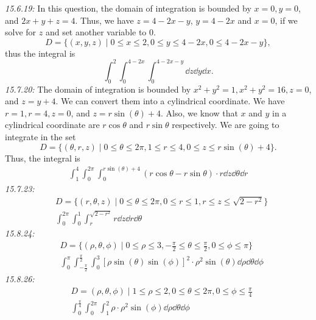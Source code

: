 \documentclass[8pt,twocolumn]{article}
\begin{document}
\begin{Answer}[number=19]
  \emph{15.6.19:}
  In this question, the domain of integration is bounded by $x=0, y=0$, and
  $2x+y+z=4$. Thus, we have $z=4-2x-y$, $y=4-2x$ and $x=0$, if we solve for $z$
  and set another variable to $0$.
  \[D = \{(x,y,z) \mid 0\le x\le 2, 0\le y\le 4-2x, 0\le 4-2x-y\},\] thus the
  integral is
  \[\int_0^2\int_0^{4-2x}\int_0^{4-2x-y}\dd{z}\dd{y}\dd{x}.\]
  \emph{15.7.20:}
  The domain of integration is bounded by $x^2+y^2=1, x^2+y^2=16, z=0$, and
  $z=y+4$. We can convert them into a cylindrical coordinate. We have $r=1,
  r=4, z=0$, and $z=r\sin(\theta)+4$. Also, we know that $x$ and $y$ in a
  cylindrical coordinate are $r\cos\theta$ and $r\sin\theta$ respectively. We
  are going to integrate in the set
  \[
    D = \{(\theta, r, z) \mid 0\le\theta\le2\pi, 1\le r\le4, 0\le z\le
    r\sin(\theta)+4\}.
  \]
  Thus, the integral is
  \begin{align*}
    \int_1^4\int_0^{2\pi}\int_0^{r\sin(\theta)+4} (r\cos\theta-
    r\sin\theta)\cdot r\dd{z}\dd{\theta}\dd{r}
  \end{align*}
  \emph{15.7.23:}
  \begin{align*}
    &D = \{(r,\theta,z) \mid 0\le \theta\le2\pi, 0\le r\le 1, r\le z\le
    \sqrt{2-r^2}\} \\
    &\int_0^{2\pi}\int_0^1\int_r^{\sqrt{2-r^2}} r\dd{z}\dd{r}\dd{\theta}
  \end{align*}
  \emph{15.8.24:}
  \begin{align*}
    &D = \{(\rho, \theta, \phi) \mid 0\le \rho \le 3, -\frac{\pi}{2}\le
    \theta\le \frac{\pi}{2}, 0\le\phi\le \pi \} \\
    &\int_0^{\pi}\int_{-\frac{\pi}{2}}^{\frac{\pi}{2}}\int_0^3
    \left[\rho\sin(\theta)\sin(\phi)\right]^2\cdot\rho^2\sin(\theta) \dd{\rho}\dd{\theta}\dd{\phi}
  \end{align*}
  \emph{15.8.26:}
  \begin{align*}
    &D = {(\rho, \theta, \phi)\mid1\le\rho\le2, 0\le\theta\le2\pi,
    0\le\phi\le\frac{\pi}{4}} \\
    &\int_0^{\frac{\pi}{4}}\int_0^{2\pi}\int_1^2 \rho \cdot \rho^2\sin(\phi) \dd{\rho}\dd{\theta}\dd{\phi}
  \end{align*}
\end{Answer}
\end{document}
